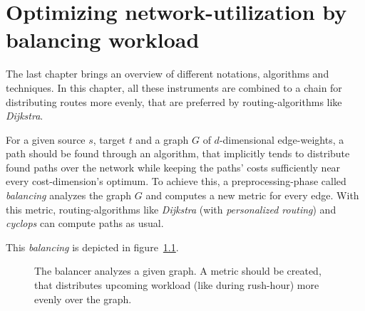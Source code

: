 \chapter{Optimizing network-utilization by balancing workload}
\label{chap:balancing}

The last chapter brings an overview of different notations, algorithms and techniques.
In this chapter, all these instruments are combined to a chain for distributing routes more evenly, that are preferred by routing-algorithms like \textit{Dijkstra}.

For a given source $s$, target $t$ and a graph $G$ of $d$-dimensional edge-weights, a path should be found through an algorithm, that implicitly tends to distribute found paths over the network while keeping the paths' costs sufficiently near every cost-dimension's optimum.
To achieve this, a preprocessing-phase called \textit{balancing} analyzes the graph $G$ and computes a new metric for every edge.
With this metric, routing-algorithms like \textit{Dijkstra}  (with \textit{personalized routing}) and \textit{cyclops} can compute paths as usual.

This \textit{balancing} is depicted in figure~\ref{fig:balancing}.

\begin{figure}
    \centering
    
    \caption[Overview of balancing a graph]{%
        The balancer analyzes a given graph.
        A metric should be created, that distributes upcoming workload (like during rush-hour) more evenly over the graph.
        \label{fig:balancing}
    }
\end{figure}



